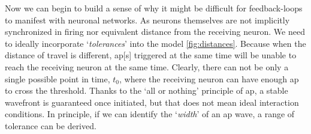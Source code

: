\documentclass[class={myRUCProject}, crop=false]{standalone}
\begin{document}
Now we can begin to build a sense of why it might be difficult for feedback-loops to manifest with neuronal networks. 
As neurons themselves are not implicitly synchronized in firing nor equivalent distance from the receiving neuron. We need to ideally incorporate `\emph{tolerances}' into the model \cref{fig:distances}.
Because when the distance of travel is different, \gls{ap}[s] triggered at the same time will be unable to reach the receiving neuron at the same time.
Clearly, there can not be only a single possible point in time, \(t_0\), where the receiving neuron can have enough \gls{ap} to cross the threshold. 
Thanks to the `all or nothing' principle of \gls{ap}, a stable wavefront is guaranteed once initiated, but that does not mean ideal interaction conditions.
In principle, if we can identify the `\emph{width}' of an \gls{ap} wave, a range of tolerance can be derived. 
\end{document}

